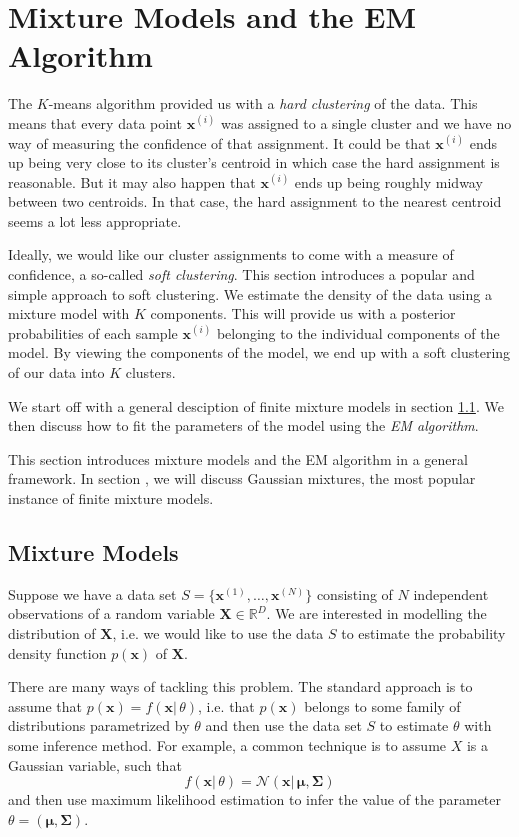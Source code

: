 \documentclass[final,3p,times,twocolumn]{elsarticle}
\let\bs\boldsymbol
\begin{document}
\section{Mixture Models and the EM Algorithm}
\label{sect:fmm}
The $K$-means algorithm provided us with a \emph{hard clustering} of the data.
This means that every data point $\bs x^{(i)}$ was assigned to a single cluster and we have no way of measuring the confidence of that assignment.
It could be that $\bs x^{(i)}$ ends up being very close to its cluster's centroid in which case the hard assignment is reasonable.
But it may also happen that $\bs x^{(i)}$ ends up being roughly midway between two centroids.
In that case, the hard assignment to the nearest centroid seems a lot less appropriate.

Ideally, we would like our cluster assignments to come with a measure of confidence, a so-called \emph{soft clustering}.
This section introduces a popular and simple approach to soft clustering.
We estimate the density of the data using a mixture model with $K$ components.
This will provide us with a posterior probabilities of each sample $\bs x^{(i)}$ belonging to the individual components of the model.
By viewing the components of the model, we end up with a soft clustering of our data into $K$ clusters.

We start off with a general desciption of finite mixture models in section \ref{sect:mixtures}.
We then discuss how to fit the parameters of the model using the \emph{EM algorithm}.

This section introduces mixture models and the EM algorithm in a general framework.
In section \label{sect:gmm}, we will discuss Gaussian mixtures, the most popular instance of finite mixture models.





\subsection{Mixture Models}
\label{sect:mixtures}
Suppose we have a data set $S = \{\bs x^{(1)},\dots,\bs x^{(N)}\}$ consisting of $N$ independent observations of a random variable $\bs X \in \mathbb{R}^D$.
We are interested in modelling the distribution of $\bs X$, i.e. we would like to use the data $S$ to estimate the probability density function $p(\bs x)$ of $\bs X$.

There are many ways of tackling this problem. 
The standard approach is to assume that $p(\bs x) = f(\bs x|\,\theta)$, i.e. that $p(\bs x)$ belongs to some family of distributions parametrized by $\theta$ and then use the data set $S$ to estimate $\theta$ with some inference method.
For example, a common technique is to assume $X$ is a Gaussian variable, such that 
\begin{equation}
f(\bs x |\,\theta) = \mathcal{N}(\bs x|\,\bs\mu,\bs \Sigma)
\end{equation}
and then use maximum likelihood estimation to infer the value of the parameter $\theta = (\bs\mu,\bs\Sigma)$.
\end{document}
